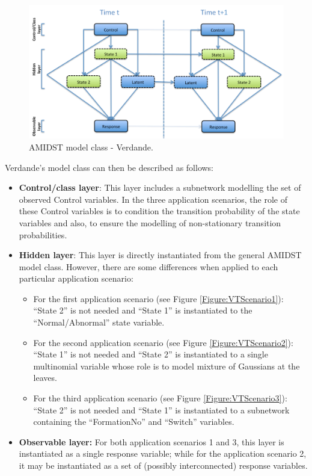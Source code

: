 \begin{figure}[ht!]
\begin{center}
\includegraphics[scale=0.39]{./figures/AMIDSTModelClassVerdande}
\caption{\label{Figure:AMIDSTModelClassVerdande} AMIDST model class - Verdande.}
\end{center}
\end{figure}

Verdande's model class can then be described as follows:

\begin{itemize}
\item \textbf{Control/class layer}:  This layer includes a subnetwork modelling the set of observed Control variables. In the three application scenarios, the role of these Control variables is to condition the transition probability of the state variables and also, to ensure the modelling of non-stationary transition probabilities.  

\item \textbf{Hidden layer}: This layer is directly instantiated from the general AMIDST model class. However, there are some differences when applied to each particular application scenario:

\begin{itemize}
\item For the first application scenario (see Figure \ref{Figure:VTScenario1}):  ``State 2'' is not needed and ``State 1'' is instantiated to the ``Normal/Abnormal'' state variable. 

\item For the second application scenario (see Figure \ref{Figure:VTScenario2}): ``State 1'' is not needed and ``State 2'' is instantiated to a single multinomial variable whose role is to model mixture of Gaussians at the leaves. 

\item For the third application scenario (see Figure \ref{Figure:VTScenario3}): ``State 2'' is not needed and ``State 1'' is instantiated to a subnetwork containing the ``FormationNo'' and ``Switch'' variables.
\end{itemize}

\item \textbf{Observable layer:} For both application scenarios 1 and 3, this layer is instantiated as a single response variable; while for the application scenario 2, it may be instantiated as a set of (possibly interconnected) response variables. 
\end{itemize}

